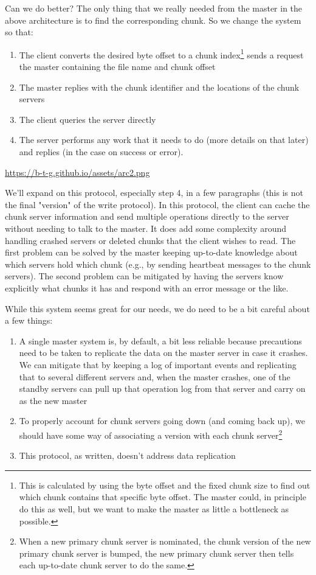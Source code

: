 \documentclass[11pt]{article}
\begin{document}
Can we do better? The only thing that we really needed from the master in the above architecture is to find the corresponding chunk. So we change the system so that:
\begin{enumerate}
\item The client converts the desired byte offset to a chunk index\footnote{This is calculated by using the byte offset and the fixed chunk size to find out which chunk contains that specific byte offset. The master could, in principle do this as well,
but we want to make the master as little a bottleneck as possible.} sends a request the master containing the file name and chunk offset
\item The master replies with the chunk identifier and the locations of the chunk servers
\item The client queries the server directly
\item The server performs any work that it needs to do (more details on that later) and replies (in the case on success or error).
\end{enumerate}

\url{https://b-t-g.github.io/assets/arc2.png}

We'll expand on this protocol, especially step 4, in a few paragraphs (this is not the final "version" of the write protocol). In this protocol, the client can cache the chunk server
information and send multiple operations directly to the server without needing to talk to the master. It does add some complexity around handling crashed servers or deleted
chunks that the client wishes to read. The first problem can be solved by the master keeping up-to-date knowledge about which servers hold which chunk
(e.g., by sending heartbeat messages to the chunk servers). The second problem can be mitigated by having the servers know explicitly what chunks it has and respond with an
error message or the like.

While this system seems great for our needs, we do need to be a bit careful about a few things:
\begin{enumerate}
\item A single master system is, by default, a bit less reliable because precautions need to be taken to replicate the data on the master server in case it crashes.
We can mitigate that by keeping a log of important events and replicating that to several different servers and, when the master crashes, one of the standby
servers can pull up that operation log from that server and carry on as the new master
\item To properly account for chunk servers going down (and coming back up), we should have some way of associating a version with each chunk server\footnote{When a new primary chunk server is nominated, the chunk version of the new primary chunk server is bumped, the new primary chunk server then tells each up-to-date chunk server to do the same.}
\item This protocol, as written, doesn't address data replication
\end{enumerate}
\end{document}
